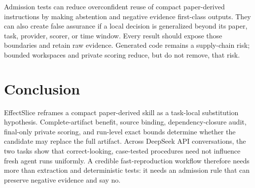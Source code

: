 \documentclass[letterpaper]{article} %
\begin{document}
Admission tests can reduce overconfident reuse of compact paper-derived
instructions by making abstention and negative evidence first-class outputs.
They can also create false assurance if a local decision is generalized beyond
its paper, task, provider, scorer, or time window.  Every result should expose
those boundaries and retain raw evidence.  Generated code remains a
supply-chain risk; bounded workspaces and private scoring reduce, but do not
remove, that risk.

\section{Conclusion}

EffectSlice reframes a compact paper-derived skill as a task-local substitution
hypothesis.  Complete-artifact benefit, source binding, dependency-closure
audit, final-only private scoring, and run-level exact bounds determine whether
the candidate may replace the full artifact.  Across
\EffectSliceProviderConversations{} DeepSeek API conversations, the two tasks
show that correct-looking, case-tested procedures need not influence fresh
agent runs uniformly.  A credible fast-reproduction workflow therefore needs
more than extraction and deterministic tests: it needs an admission rule that
can preserve negative evidence and say no.


\end{document}
